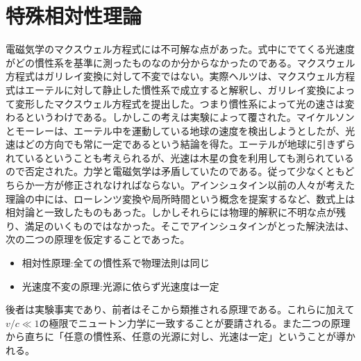 \part{特殊相対性理論}
    電磁気学のマクスウェル方程式には不可解な点があった。式中にでてくる光速度がどの慣性系を基準に測ったものなのか分からなかったのである。マクスウェル方程式はガリレイ変換に対して不変ではない。実際ヘルツは、マクスウェル方程式はエーテルに対して静止した慣性系で成立すると解釈し、ガリレイ変換によって変形したマクスウェル方程式を提出した。つまり慣性系によって光の速さは変わるというわけである。しかしこの考えは実験によって覆された。マイケルソンとモーレーは、エーテル中を運動している地球の速度を検出しようとしたが、光速はどの方向でも常に一定であるという結論を得た。エーテルが地球に引きずられているということも考えられるが、光速は木星の食を利用しても測られているので否定された。力学と電磁気学は矛盾していたのである。従って少なくともどちらか一方が修正されなければならない。アインシュタイン以前の人々が考えた理論の中には、ローレンツ変換や局所時間という概念を提案するなど、数式上は相対論と一致したものもあった。しかしそれらには物理的解釈に不明な点が残り、満足のいくものではなかった。そこでアインシュタインがとった解決法は、次の二つの原理を仮定することであった。
    \begin{itemize}
        \item 相対性原理:全ての慣性系で物理法則は同じ
        \item 光速度不変の原理:光源に依らず光速度は一定
    \end{itemize}
    後者は実験事実であり、前者はそこから類推される原理である。これらに加えて$v/c\ll 1$の極限でニュートン力学に一致することが要請される。また二つの原理から直ちに「任意の慣性系、任意の光源に対し、光速は一定」ということが導かれる。
